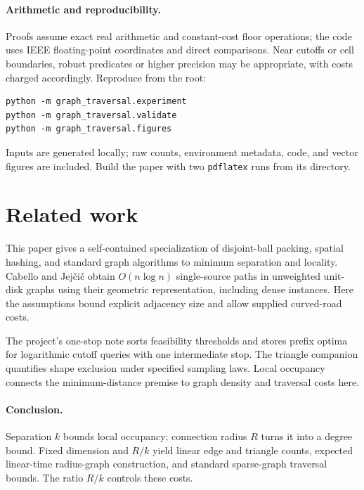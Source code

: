 \documentclass[11pt]{article}
\begin{document}
\paragraph{Arithmetic and reproducibility.}
Proofs assume exact real arithmetic and constant-cost floor operations;
the code uses IEEE floating-point coordinates and direct comparisons.
Near cutoffs or cell boundaries, robust predicates or higher precision
may be appropriate, with costs charged accordingly. Reproduce from the root:
\begin{verbatim}
python -m graph_traversal.experiment
python -m graph_traversal.validate
python -m graph_traversal.figures
\end{verbatim}
Inputs are generated locally; raw counts, environment metadata, code, and
vector figures are included. Build the paper with two \texttt{pdflatex}
runs from its directory.

\section{Related work}
This paper gives a self-contained specialization of disjoint-ball packing,
spatial hashing, and standard graph algorithms to minimum separation and
locality. Cabello and Jej\v{c}i\v{c} \cite{cabello} obtain $O(n\log n)$
single-source paths in unweighted unit-disk graphs using their geometric
representation, including dense instances. Here the assumptions bound
explicit adjacency size and allow supplied curved-road costs.

The project's one-stop note \cite{onestop} sorts feasibility thresholds
and stores prefix optima for logarithmic cutoff queries with one
intermediate stop. The triangle companion \cite{triangles} quantifies
shape exclusion under specified sampling laws. Local occupancy connects
the minimum-distance premise to graph density and traversal costs here.

\paragraph{Conclusion.}
Separation $k$ bounds local occupancy; connection radius $R$ turns it
into a degree bound. Fixed dimension and $R/k$ yield linear edge and
triangle counts, expected linear-time radius-graph construction, and
standard sparse-graph traversal bounds. The ratio $R/k$ controls these costs.
\end{document}
